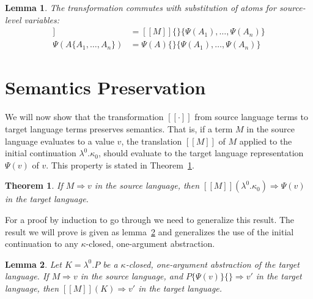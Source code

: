 \documentclass[a4paper,11pt,draft]{article}
\newtheorem{lemma}{\sffamily Lemma}
\newtheorem{theorem}{\sffamily Theorem}
\begin{document}
\begin{lemma}\label{lem:commuting}
  The transformation commutes with substitution of atoms for source-level variables:
  \begin{align*}
    [\![M\{A_{1}, \ldots, A_{n}\}]\!] &= [\![M]\!]\{\}\{\Psi(A_{1}), \ldots, \Psi(A_{n})\} \\
    \Psi(A\{A_{1}, \ldots, A_{n}\})   &= \Psi(A)\{\}\{\Psi(A_{1}), \ldots, \Psi(A_{n})\}
  \end{align*}
\end{lemma}


\section{Semantics Preservation}\label{sec:semanticpreservation}

We will now show that the transformation $[\![\cdot]\!]$ from source language
terms to target language terms preserves semantics. That is, if a term $M$ in
the source language evaluates to a value $v$, the translation $[\![M]\!]$ of $M$
applied to the initial continuation $\lambda^{0}.\kappa_{0}$, should evaluate to
the target language representation $\Psi(v)$ of $v$. This property is stated in
Theorem~\ref{thm:maintheorem}.

\begin{theorem}\label{thm:maintheorem}
If $M \Rightarrow v$ in the source language, then
$[\![M]\!] (\lambda^{0}.\kappa_{0}) \Rightarrow \Psi(v)$ in the target language.
\end{theorem}

For a proof by induction to go through we need to generalize this result. The
result we will prove is given as lemma~\ref{lem:mainlemma} and generalizes the
use of the initial continuation to any $\kappa$-closed, one-argument
abstraction.

\begin{lemma}\label{lem:mainlemma}
  Let $K = \lambda^{0}.P$ be a $\kappa$-closed, one-argument
  abstraction of the target language. If $M \Rightarrow v$ in the
  source language, and $P\{\Psi(v)\}\{\} \Rightarrow v'$ in the target
  language, then $[\![M]\!](K) \Rightarrow v'$ in the target language.
\end{lemma}
\end{document}
